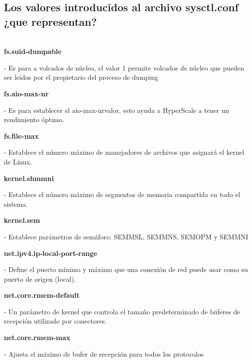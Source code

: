 \documentclass[12pt,letterpaper]{article}
\begin{document}
\subsection{Los valores introducidos al archivo sysctl.conf ¿que representan?}\\
\textbf{fs.suid-dumpable}
\begin{itemize}
- Es para a volcados de núcleo, el valor 1 permite volcados de núcleo que pueden ser leídos por el propietario del proceso de dumping \\
\end{itemize}

\textbf{fs.aio-max-nr}
\begin{itemize}
- Es para establecer el aio-max-nrvalor, esto ayuda a HyperScale a tener un rendimiento óptimo. \\
\end{itemize}

\textbf{fs.file-max}
\begin{itemize}
- Establece el número máximo de manejadores de archivos que asignará el kernel de Linux. \\
\end{itemize}

\textbf{kernel.shmmni}
\begin{itemize}
- Establece el número máximo de segmentos de memoria compartida en todo el sistema. \\
\end{itemize}

\textbf{kernel.sem }
\begin{itemize}
- Establece parámetros de semáforo: SEMMSL, SEMMNS, SEMOPM y SEMMNI \\
\end{itemize}

\textbf{net.ipv4.ip-local-port-range}
\begin{itemize}
- Define el puerto mínimo y máximo que una conexión de red puede usar como su puerto de origen (local). \\
\end{itemize}

\textbf{net.core.rmem-default}
\begin{itemize}
- Un parámetro de kernel que controla el tamaño predeterminado de búferes de recepción utilizado por conectores. \\
\end{itemize}

\textbf{net.core.rmem-max }
\begin{itemize}
- Ajusta el máximo de bufer de recepción para todos los protocolos \\
\end{itemize}
\end{document}
